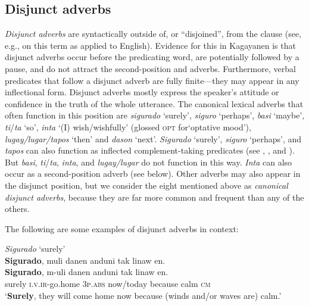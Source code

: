 \subsection{Disjunct adverbs}
\label{bkm:Ref441599506}
\textit{Disjunct adverbs} are syntactically outside of, or “disjoined”, from the clause (see, e.g., \citealt{greenbaum1996} on this term as applied to English). Evidence for this in Kagayanen is that disjunct adverbs occur before the predicating word, are potentially followed by a pause, and do not attract the second-position  and adverbs. Furthermore, verbal predicates that follow a disjunct adverb are fully finite---they may appear in any inflectional form. Disjunct adverbs mostly express the speaker’s attitude or confidence in the truth of the whole utterance. The canonical lexical adverbs that often function in this position are \textit{sigurado} ‘surely’, \textit{siguro} ‘perhaps’, \textit{basi} ‘maybe’, \textit{ti}/\textit{ta} ‘so’, \textit{inta} ‘(I) wish/wishfully’ (glossed \textsc{opt} for`optative mood'), \textit{lugay/lugar/tapos} ‘then’ and \textit{dason} ‘next’. \textit{Sigurado} ‘surely’, \textit{siguro} ‘perhaps’, and \textit{tapos} can also function as inflected comple\-ment-taking predicates (see , , and ). But \textit{basi}, \textit{ti}/\textit{ta}, \textit{inta}, and \textit{lugay/lugar} do not function in this way.
\textit{Inta} can also occur as a second-position adverb (see  below). Other adverbs may also appear in the disjunct position, but we consider the eight mentioned above as \textit{canonical disjunct adverbs}, because they are far more common and frequent than any of the others.

The following are some examples of disjunct adverbs in context:

\ea
\label{bkm:Ref441903321}
\textit{Sigurado} ‘surely’ \\
\textbf{Sigurado},  muli  danen  anduni  tak  linaw  en. \\\smallskip
 \gll \textbf{Sigurado},  m-uli  danen  anduni  tak  linaw  en. \\
surely  \textsc{i.v.ir}-go.home  3\textsc{p.abs}  now/today  because  calm  \textsc{cm} \\
\glt ‘\textbf{Surely}, they will come home now because (winds and/or waves are) calm.’
\z

